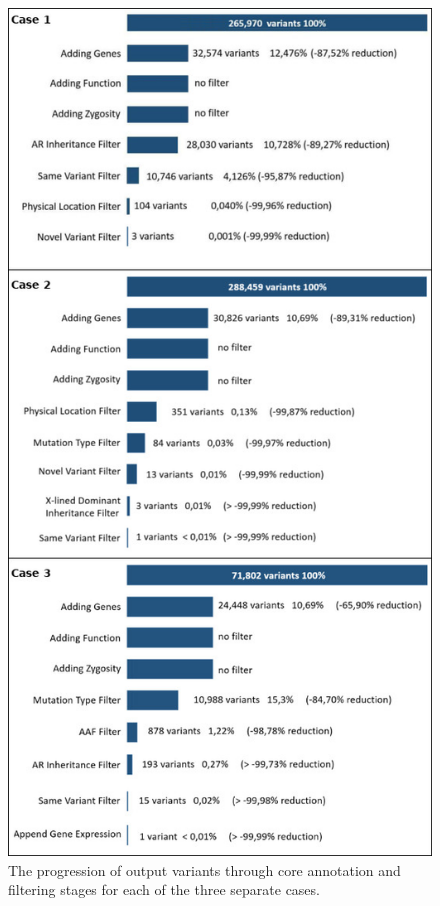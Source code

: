 \documentclass{bioinfo}
\begin{document}
\begin{figure}[!tpb]
  \centerline{\includegraphics[width=\columnwidth]{control_result_total.jpg}}\caption{The progression of output variants through core annotation and filtering stages for each of the three separate cases.}\label{fig:result}
\end{figure}
\end{document}
